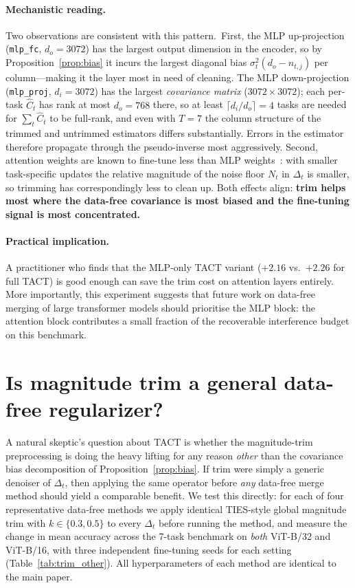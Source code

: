 \documentclass{article}
\theoremstyle{plain}
\theoremstyle{definition}
\theoremstyle{remark}
\begin{document}
\paragraph{Mechanistic reading.} Two observations are consistent with this pattern.\ First, the MLP up-projection (\texttt{mlp\_fc}, $d_o\!=\!3072$) has the largest output dimension in the encoder, so by Proposition~\ref{prop:bias} it incurs the largest diagonal bias $\sigma_t^2(d_o - n_{t,j})$ per column---making it the layer most in need of cleaning. The MLP down-projection (\texttt{mlp\_proj}, $d_i\!=\!3072$) has the largest \emph{covariance matrix} ($3072\!\times\!3072$); each per-task $\hat C_t$ has rank at most $d_o\!=\!768$ there, so at least $\lceil d_i/d_o \rceil\!=\!4$ tasks are needed for $\sum_t \hat C_t$ to be full-rank, and even with $T\!=\!7$ the column structure of the trimmed and untrimmed estimators differs substantially. Errors in the estimator therefore propagate through the pseudo-inverse most aggressively. Second, attention weights are known to fine-tune less than MLP weights~\citep{vu2022spot, hu2022lora, kornblith2019better}: with smaller task-specific updates the relative magnitude of the noise floor $N_t$ in $\Delta_t$ is smaller, so trimming has correspondingly less to clean up. Both effects align: \textbf{trim helps most where the data-free covariance is most biased and the fine-tuning signal is most concentrated.}

\paragraph{Practical implication.} A practitioner who finds that the MLP-only TACT variant ($+2.16$ vs.~$+2.26$ for full TACT) is good enough can save the trim cost on attention layers entirely. More importantly, this experiment suggests that future work on data-free merging of large transformer models should prioritise the MLP block: the attention block contributes a small fraction of the recoverable interference budget on this benchmark.

\section{Is magnitude trim a general data-free regularizer?}
\label{app:trim_other}

A natural skeptic's question about TACT is whether the magnitude-trim preprocessing is doing the heavy lifting for any reason \emph{other} than the covariance bias decomposition of Proposition~\ref{prop:bias}. If trim were simply a generic denoiser of $\Delta_t$, then applying the same operator before \emph{any} data-free merge method should yield a comparable benefit. We test this directly: for each of four representative data-free methods we apply identical TIES-style global magnitude trim with $k \in \{0.3, 0.5\}$ to every $\Delta_t$ before running the method, and measure the change in mean accuracy across the 7-task benchmark on \emph{both} ViT-B/32 and ViT-B/16, with three independent fine-tuning seeds for each setting (Table~\ref{tab:trim_other}). All hyperparameters of each method are identical to the main paper.
\end{document}
